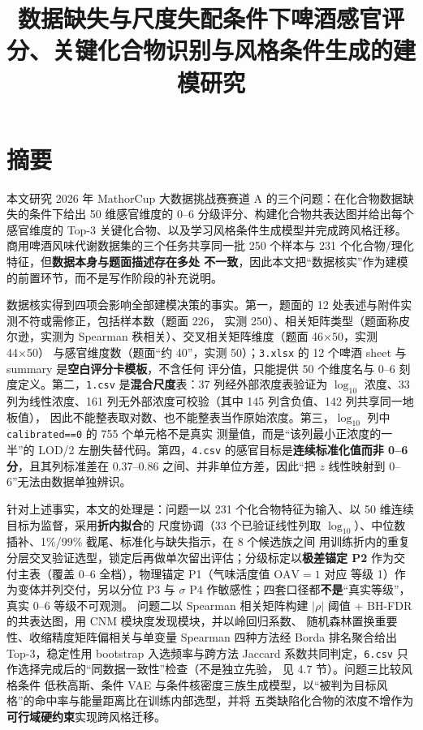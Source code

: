 \documentclass[
  a4paper,12pt]{article}
\title{数据缺失与尺度失配条件下啤酒感官评分、关键化合物识别与风格条件生成的建模研究}
\author{}
\date{}
\begin{document}
\maketitle

\renewcommand*\contentsname{目录}
{
\setcounter{tocdepth}{1}
\tableofcontents
}
\section*{摘要}\label{ux6458ux8981}

本文研究 2026 年 MathorCup 大数据挑战赛赛道 A
的三个问题：在化合物数据缺失的条件下给出 50 维感官维度的 0--6
分级评分、构建化合物共表达图并给出每个感官维度的 Top-3
关键化合物、以及学习风格条件生成模型并完成跨风格迁移。
商用啤酒风味代谢数据集的三个任务共享同一批 250 个样本与 231
个化合物/理化特征，但\textbf{数据本身与题面描述存在多处
不一致}，因此本文把``数据核实''作为建模的前置环节，而不是写作阶段的补充说明。

数据核实得到四项会影响全部建模决策的事实。第一，题面的 12
处表述与附件实测不符或需修正，包括样本数（题面 226， 实测
250）、相关矩阵类型（题面称皮尔逊，实测为 Spearman
秩相关）、交叉相关矩阵维度（题面 46×50，实测 44×50）
与感官维度数（题面``约 40''，实测 50）；\texttt{3.xlsx} 的 12 个啤酒
sheet 与 summary 是\textbf{空白评分卡模板}，不含任何 评分值，只能提供 50
个维度名与 0--6 刻度定义。第二，\texttt{1.csv} 是\textbf{混合尺度}表：37
列经外部浓度表验证为 \(\log_{10}\) 浓度、33 列为线性浓度、161
列无外部浓度可校验（其中 145 列含负值、142 列共享同一地板值），
因此不能整表取对数、也不能整表当作原始浓度。第三，\(\log_{10}\) 列中
\texttt{calibrated==0} 的 755 个单元格不是真实
测量值，而是``该列最小正浓度的一半''的 LOD/2
左删失替代码。第四，\texttt{4.csv} 的感官目标是\textbf{连续标准化值而非
0--6 分}，且其列标准差在 0.37--0.86 之间、并非单位方差，因此``把 \(z\)
线性映射到 0--6''无法由数据单独辨识。

针对上述事实，本文的处理是：问题一以 231 个化合物特征为输入、以 50
维连续目标为监督，采用\textbf{折内拟合}的 尺度协调（33 个已验证线性列取
\(\log_{10}\)）、中位数插补、1\%/99\% 截尾、标准化与缺失指示，在 8
个候选族之间
用训练折内的重复分层交叉验证选型，锁定后再做单次留出评估；分级标定以\textbf{极差锚定
P2} 作为交付主表（覆盖 0--6 全档），物理锚定 P1（气味活度值
\(\mathrm{OAV}=1\) 对应 等级 1）作为变体并列交付，另以分位 P3 与
\(\sigma\) P4 作敏感性；四套口径都\textbf{不是}``真实等级''，真实 0--6
等级不可观测。 问题二以 Spearman 相关矩阵构建 \(|\rho|\) 阈值 + BH-FDR
的共表达图，用 CNM 模块度发现模块，并以岭回归系数、
随机森林置换重要性、收缩精度矩阵偏相关与单变量 Spearman 四种方法经 Borda
排名聚合给出 Top-3，稳定性用 bootstrap 入选频率与跨方法 Jaccard
系数共同判定，\texttt{6.csv}
只作选择完成后的``同数据一致性''检查（不是独立先验， 见 4.7
节）。问题三比较风格条件 低秩高斯、条件 VAE
与条件核密度三族生成模型，以``被判为目标风格''的命中率与能量距离比在训练内部选型，并将
五类缺陷化合物的浓度不增作为\textbf{可行域硬约束}实现跨风格迁移。
\end{document}
